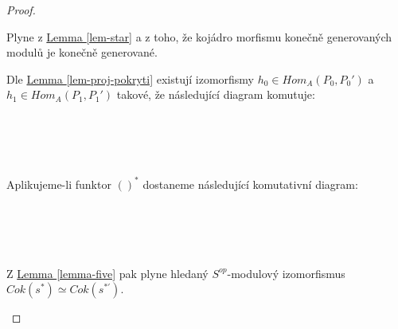      \begin{proof}
       \begin{description}
         \item
         \item[(a)] Plyne z \hyperref[lem-star]{Lemma \ref*{lem-star}} a z toho, 
           že kojádro morfismu konečně generovaných modulů je konečně 
           generované.
         \item[(b)] Dle \hyperref[lem-proj-pokryti]{Lemma \ref*{lem-proj-pokryti}}
           existují izomorfismy $h_0\in Hom_A(P_0,P_0')$ a $h_1\in Hom_A(P_1,P_1')$ 
           takové, že následující diagram komutuje: \\\\
           \centerline{}\\\\\\       
           Aplikujeme-li funktor $()^*$ dostaneme následující komutativní 
           diagram:\\\\
           \centerline{}\\\\\\       
           Z \hyperref[lemma-five]{Lemma \ref*{lemma-five}} pak plyne hledaný $S^{op}$-modulový 
           izomorfismus $Cok(s^{*})\simeq Cok(s^{*'})$.
         \end{description} 
     \end{proof}
     
